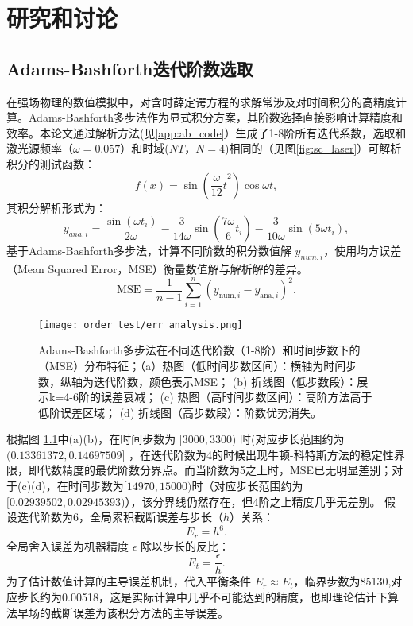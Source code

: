 \chapter{研究和讨论}
\section{Adams-Bashforth迭代阶数选取}
在强场物理的数值模拟中，对含时薛定谔方程的求解常涉及对时间积分的高精度计算。Adams-Bashforth多步法作为显式积分方案，其阶数选择直接影响计算精度和效率。本论文通过解析方法(见\ref{app:ab_code}）生成了1-8阶所有迭代系数，选取和激光源频率（$\omega = 0.057$）和时域($N T$，$N = 4$)相同的（见图\ref{fig:sc_laser}）可解析积分的测试函数：
\begin{equation}
	f(x) = \sin({\frac{\omega}{12} t}^2) \cos{\omega t},
\end{equation}
其积分解析形式为：
\begin{equation}
	y_{ana, i} = \frac{\sin{(\omega t_i)}}{2\omega} - \frac{3}{14\omega}\sin{(\frac{7\omega}{6} t_i)} - 
	\frac{3}{10\omega}\sin{(5\omega t_i)},
\end{equation}
基于​​Adams-Bashforth多步法​​，计算不同阶数的积分数值解 $y_{num, i}$，使用均方误差（​​Mean Squared Error​​，MSE）衡量数值解与解析解的差异。
\begin{equation}
	\text{MSE} = \frac{1}{n-1} \sum_{i=1}^n \left( y_{\text{num},i} - y_{\text{ana},i} \right)^2.
\end{equation}

\begin{figure}[!htbp]  %
	\centering
	\texttt{[image: order\_test/err\_analysis.png]}
	\caption{Adams-Bashforth多步法在不同迭代阶数（1-8阶）和时间步数下的（MSE）分布特征；（a）热图（低时间步数区间）：横轴为时间步数，纵轴为迭代阶数，颜色表示MSE；
		(b) 折线图（低步数段）：展示k=4-6阶的误差衰减；
		(c) 热图（高时间步数区间）：高阶方法高于低阶误差区域；
		(d) 折线图（高步数段）：阶数优势消失。}
	\label{fig:err_analysis}
\end{figure}

根据图 \ref{fig:err_analysis}中(a)(b)，在时间步数为 $[3000, 3300)$ 时(对应步长范围约为 $(0.13361372, 0.14697509]$ ，在迭代阶数为4的时候出现牛顿-科特斯方法的稳定性界限，即代数精度的最优阶数分界点。而当阶数为5之上时，MSE已无明显差别；对于(c)(d)，在时间步数为$[14970, 15000)$时（对应步长范围约为 $[0.02939502, 0.02945393)$），该分界线仍然存在，但4阶之上精度几乎无差别。
假设迭代阶数为6，全局累积截断误差与步长（$h$）关系：
\begin{equation}
	E_{r} = h^6.
\end{equation}
全局舍入误差为机器精度 $\epsilon$ 除以步长的反比：
\begin{equation}
	E_{t} = \frac{\epsilon}{h}.
\end{equation}
为了估计数值计算的主导误差机制，代入平衡条件 $E_{r}\approx E_{t}$，临界步数为85130,对应步长约为0.00518，这是实际计算中几乎不可能达到的精度，也即理论估计下算法早场的截断误差为该积分方法的主导误差。

